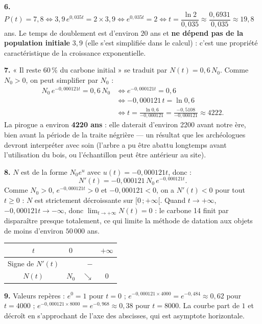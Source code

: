\documentclass[11pt]{article}
\newcommand{\cle}[1]{{\popxbold\color{popdark}#1}}
\begin{document}
\begin{exoresolu}
\textbf{6.} $P(t) = 7,8 \iff 3,9\,e^{0,035t} = 2 \times 3,9 \iff e^{0,035t} = 2 \iff t = \dfrac{\ln 2}{0,035} \approx \dfrac{0,6931}{0,035} \approx 19,8$ ans.
Le temps de doublement est d'environ $20$ ans et \textbf{ne dépend pas de la population initiale} $3,9$ (elle s'est simplifiée dans le calcul) : c'est une propriété caractéristique de la croissance exponentielle.

\textbf{7.} « Il reste $60\,\%$ du carbone initial » se traduit par $N(t) = 0,6\,N_0$. Comme $N_0 > 0$, on peut simplifier par $N_0$ :
\begin{align*}
N_0\,e^{-0,000121t} = 0,6\,N_0 &\iff e^{-0,000121t} = 0,6 \\
&\iff -0,000121\,t = \ln 0,6 \\
&\iff t = \frac{\ln 0,6}{-0,000121} = \frac{-0,5108}{-0,000121} \approx 4222.
\end{align*}
La pirogue a environ \textbf{4220 ans} : elle daterait d'environ 2200 avant notre ère, bien avant la période de la traite négrière — un résultat que les archéologues devront interpréter avec soin (l'arbre a pu être abattu longtemps avant l'utilisation du bois, ou l'échantillon peut être antérieur au site).

\textbf{8.} $N$ est de la forme $N_0 e^u$ avec $u(t) = -0,000121t$, donc :
\[ N'(t) = -0,000121\,N_0\,e^{-0,000121t}. \]
Comme $N_0 > 0$, $e^{-0,000121t} > 0$ et $-0,000121 < 0$, on a $N'(t) < 0$ pour tout $t \geq 0$ : $N$ est \cle{strictement décroissante} sur $[0\,;+\infty[$. Quand $t \to +\infty$, $-0,000121t \to -\infty$, donc $\lim_{t \to +\infty} N(t) = 0$ : le carbone 14 finit par disparaître presque totalement, ce qui limite la méthode de datation aux objets de moins d'environ $50\,000$ ans.

\begin{center}
\begin{tabular}{|c|ccc|}
\hline
\rowcolor{popblueL} $t$ & $0$ & \hspace{2.5cm} & $+\infty$ \\
\hline
Signe de $N'(t)$ & \multicolumn{3}{c|}{$-$} \\
\hline
$N(t)$ & $N_0$ & $\searrow$ & $0$ \\
\hline
\end{tabular}
\end{center}

\textbf{9.} Valeurs repères : $e^{0} = 1$ pour $t = 0$ ; $e^{-0,000121 \times 4000} = e^{-0,484} \approx 0,62$ pour $t = 4000$ ; $e^{-0,000121 \times 8000} = e^{-0,968} \approx 0,38$ pour $t = 8000$. La courbe part de $1$ et décroît en s'approchant de l'axe des abscisses, qui est asymptote horizontale.


\end{exoresolu}
\end{document}
